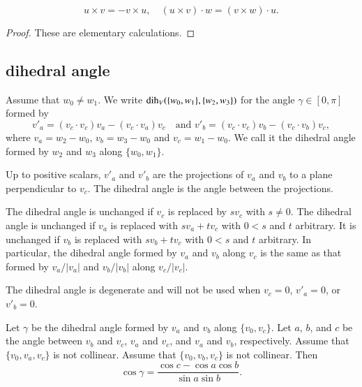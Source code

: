 \begin{lemma}
    $$
    u\times v = -v\times u,\quad
    (u\times v)\cdot w = (v\times w)\cdot u.
    $$
\end{lemma}

\begin{proof} These are elementary calculations.
\end{proof}



\subsection{dihedral angle}


\begin{definition}\label{def:dih} Assume that $w_0\ne w_1$.
We write $\operatorname{dih}_V(\{w_0,w_1\},\{w_2,w_3\})$ for the angle $\gamma\in[0,\pi]$
formed
by 
    $$
    v'_a = (v_c\cdot v_c) v_a - (v_c\cdot v_a) v_c\quad\text{and }v'_b =
            (v_c\cdot v_c) v_b - (v_c\cdot v_b) v_c,
    $$
where $v_a = w_2-w_0$, $v_b=w_3-w_0$ and $v_c=w_1-w_0$.  We call it
the dihedral angle formed by $w_2$ and $w_3$ along $\{w_0,w_1\}$.
\end{definition}

Up to positive scalars, $v'_a$ and $v'_b$ are the projections of
$v_a$ and $v_b$ to a plane perpendicular to $v_c$.  The
dihedral angle is the angle between the projections.

The dihedral angle is unchanged if $v_c$ is replaced by $s v_c$ with
$s\ne0$. The dihedral angle is unchanged if $v_a$ is replaced with
$s v_a + t v_c$ with $0 < s$ and $t$ arbitrary.  It is unchanged if
$v_b$ is replaced with $s v_b + t v_c$ with $0 < s$ and $t$
arbitrary.  In particular, the dihedral angle formed by $v_a$ and
$v_b$ along $v_c$ is the same as that formed by $v_a/|v_a|$ and
$v_b/|v_b|$ along $v_c/|v_c|$.

The dihedral angle is degenerate and will not be used when $v_c =
0$, $v'_a = 0$, or $v'_b = 0$.



\begin{lemma}
Let $\gamma$ be the dihedral angle formed by $v_a$ and $v_b$ along
$\{v_0,v_c\}$.  Let $a$, $b$, and $c$ be the
angle between $v_b$ and $v_c$, $v_a$ and $v_c$, and $v_a$ and
$v_b$, respectively. %
Assume that $\{v_0,v_a,v_c\}$ is not
collinear. Assume that $\{v_0,v_b,v_c\}$ is not collinear.
Then
    $$\cos\gamma = \frac{\cos c - \cos a \cos b}{\sin a\sin b}.$$
\end{lemma}

